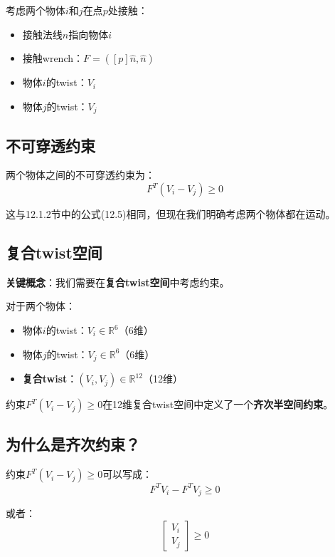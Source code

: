 \documentclass[12pt,a4paper]{article}
\begin{document}
考虑两个物体$i$和$j$在点$p$处接触：
\begin{itemize}
\item 接触法线$\hat{n}$指向物体$i$
\item 接触wrench：$F = ([p]\hat{n}, \hat{n})$
\item 物体$i$的twist：$V_i$
\item 物体$j$的twist：$V_j$
\end{itemize}

\subsection{不可穿透约束}

两个物体之间的不可穿透约束为：
\begin{equation}
F^T (V_i - V_j) \geq 0
\label{eq:two_bodies_constraint}
\end{equation}

这与12.1.2节中的公式(12.5)相同，但现在我们明确考虑两个物体都在运动。

\subsection{复合twist空间}

\textbf{关键概念}：我们需要在\textbf{复合twist空间}中考虑约束。

对于两个物体：
\begin{itemize}
\item 物体$i$的twist：$V_i \in \mathbb{R}^6$（6维）
\item 物体$j$的twist：$V_j \in \mathbb{R}^6$（6维）
\item \textbf{复合twist}：$(V_i, V_j) \in \mathbb{R}^{12}$（12维）
\end{itemize}

约束$F^T (V_i - V_j) \geq 0$在12维复合twist空间中定义了一个\textbf{齐次半空间约束}。

\subsection{为什么是齐次约束？}

约束$F^T (V_i - V_j) \geq 0$可以写成：
\begin{equation}
F^T V_i - F^T V_j \geq 0
\end{equation}

或者：
\begin{equation}
[F^T \quad -F^T] \begin{bmatrix} V_i \\ V_j \end{bmatrix} \geq 0
\end{equation}
\end{document}
